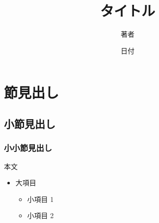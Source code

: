 \documentclass[uplatex]{jsarticle}
\title{タイトル}
\author{著者}
\date{日付}
\begin{document}
\maketitle

\section{節見出し}
\subsection{小節見出し}
\subsubsection{小小節見出し}
本文　
\begin{itemize}
  \item 大項目
  \begin{itemize}
    \item 小項目 1
    \item 小項目 2
  \end{itemize}
\end{itemize}
\end{document}
